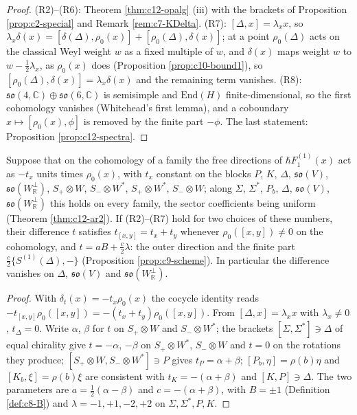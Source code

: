 \begin{proof}
(R2)--(R6): Theorem \ref{thm:c12-opalg} (iii) with the brackets of Proposition \ref{prop:c2-special} and Remark \ref{rem:c7-KDelta}. (R7): $[\Delta,x]=\lambda_xx$, so $\lambda_x\delta(x)=[\delta(\Delta),\rho_0(x)]+[\rho_0(\Delta),\delta(x)]$; at a point $\rho_0(\Delta)$ acts on the classical Weyl weight $w$ as a fixed multiple of $w$, and $\delta(x)$ maps weight $w$ to $w-\tfrac12\lambda_x$, as $\rho_0(x)$ does (Proposition \ref{prop:c10-bound1}), so $[\rho_0(\Delta),\delta(x)]=\lambda_x\delta(x)$ and the remaining term vanishes. (R8): $\mathfrak{so}(4,\mathbb C)\oplus\mathfrak{so}(6,\mathbb C)$ is semisimple and $\mathrm{End}(H)$ finite-dimensional, so the first cohomology vanishes (Whitehead's first lemma), and a coboundary $x\mapsto[\rho_0(x),\phi]$ is removed by the finite part $-\phi$. The last statement: Proposition \ref{prop:c12-spectra}.
\end{proof}

\begin{proposition}
\label{prop:c12-tfix}
Suppose that on the cohomology of a family the free directions of $\hbar F_1^{(1)}(x)$ act as $-t_x$ units times $\rho_0(x)$, with $t_x$ constant on the blocks $P$, $K$, $\Delta$, $\mathfrak{so}(V)$, $\mathfrak{so}(W_{\mathbb R}^\perp)$, $S_+\otimes W$, $S_-\otimes W^*$, $S_+\otimes W^*$, $S_-\otimes W$; along $\Sigma$, $\Sigma^*$, $P_b$, $\Delta$, $\mathfrak{so}(V)$, $\mathfrak{so}(W_{\mathbb R}^\perp)$ this holds on every family, the sector coefficients being uniform (Theorem \ref{thm:c12-ar2}). If (R2)--(R7) hold for two choices of these numbers, their difference $t$ satisfies $t_{[x,y]}=t_x+t_y$ whenever $\rho_0([x,y])\neq0$ on the cohomology, and $t=aB+\tfrac c2\lambda$: the outer direction and the finite part $\tfrac c2\{S^{(1)}(\Delta),-\}$ (Proposition \ref{prop:c9-scheme}). In particular the difference vanishes on $\Delta$, $\mathfrak{so}(V)$ and $\mathfrak{so}(W_{\mathbb R}^\perp)$.
\end{proposition}

\begin{proof}
With $\delta_t(x)=-t_x\rho_0(x)$ the cocycle identity reads $-t_{[x,y]}\rho_0([x,y])=-(t_x+t_y)\rho_0([x,y])$. From $[\Delta,x]=\lambda_xx$ with $\lambda_x\neq0$, $t_\Delta=0$. Write $\alpha$, $\beta$ for $t$ on $S_+\otimes W$ and $S_-\otimes W^*$; the brackets $[\Sigma,\Sigma^*]\ni\Delta$ of equal chirality give $t=-\alpha$, $-\beta$ on $S_+\otimes W^*$, $S_-\otimes W$ and $t=0$ on the rotations they produce; $[S_+\otimes W,S_-\otimes W^*]\ni P$ gives $t_P=\alpha+\beta$; $[P_b,\eta]=\rho(b)\eta$ and $[K_b,\xi]=\rho(b)\xi$ are consistent with $t_K=-(\alpha+\beta)$ and $[K,P]\ni\Delta$. The two parameters are $a=\tfrac12(\alpha-\beta)$ and $c=-(\alpha+\beta)$, with $B=\pm1$ (Definition \ref{def:c8-B}) and $\lambda=-1,+1,-2,+2$ on $\Sigma,\Sigma^*,P,K$.
\end{proof}

